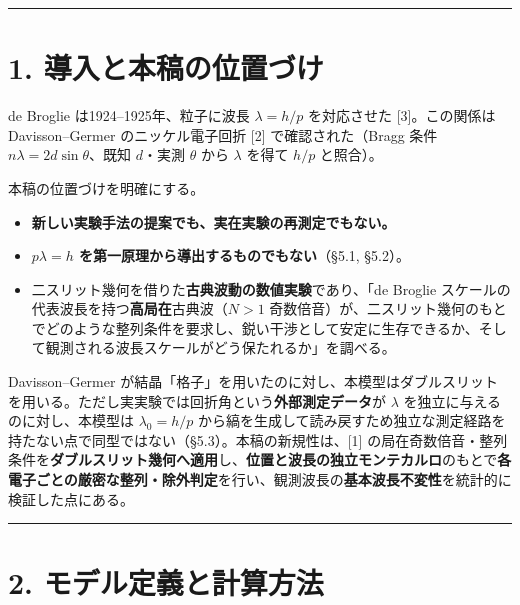 \documentclass[11pt,a4paper]{ltjsarticle}
\providecommand{\tightlist}{\setlength{\itemsep}{0pt}\setlength{\parskip}{0pt}}
\begin{document}
\begin{center}\rule{0.5\linewidth}{0.5pt}\end{center}

\section{1.
導入と本稿の位置づけ}\label{ux5c0eux5165ux3068ux672cux7a3fux306eux4f4dux7f6eux3065ux3051}

de Broglie は1924--1925年、粒子に波長 \(\lambda=h/p\) を対応させた
{[}3{]}。この関係は Davisson--Germer のニッケル電子回折 {[}2{]}
で確認された（Bragg 条件 \(n\lambda=2d\sin\theta\)、既知 \(d\)・実測
\(\theta\) から \(\lambda\) を得て \(h/p\) と照合）。

本稿の位置づけを明確にする。

\begin{itemize}
\tightlist
\item
  \textbf{新しい実験手法の提案でも、実在実験の再測定でもない。}
\item
  \textbf{\(p\lambda=h\) を第一原理から導出するものでもない}（§5.1,
  §5.2）。
\item
  二スリット幾何を借りた\textbf{古典波動の数値実験}であり、「de Broglie
  スケールの代表波長を持つ\textbf{高局在}古典波（\(N>1\)
  奇数倍音）が、二スリット幾何のもとでどのような整列条件を要求し、鋭い干渉として安定に生存できるか、そして観測される波長スケールがどう保たれるか」を調べる。
\end{itemize}

Davisson--Germer
が結晶「格子」を用いたのに対し、本模型はダブルスリットを用いる。ただし実実験では回折角という\textbf{外部測定データ}が
\(\lambda\) を独立に与えるのに対し、本模型は \(\lambda_0=h/p\)
から縞を生成して読み戻すため独立な測定経路を持たない点で同型ではない（§5.3）。本稿の新規性は、{[}1{]}
の局在奇数倍音・整列条件を\textbf{ダブルスリット幾何へ適用}し、\textbf{位置と波長の独立モンテカルロ}のもとで\textbf{各電子ごとの厳密な整列・除外判定}を行い、観測波長の\textbf{基本波長不変性}を統計的に検証した点にある。

\begin{center}\rule{0.5\linewidth}{0.5pt}\end{center}

\section{2.
モデル定義と計算方法}\label{ux30e2ux30c7ux30ebux5b9aux7fa9ux3068ux8a08ux7b97ux65b9ux6cd5}
\end{document}
